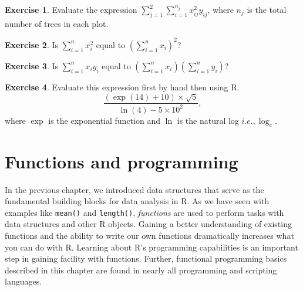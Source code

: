 \documentclass[
  11pt,
]{krantz}
\theoremstyle{definition}
\theoremstyle{definition}
\theoremstyle{definition}
\newtheorem{exercise}{Exercise}[chapter]
\theoremstyle{definition}
\theoremstyle{remark}
\begin{document}
\begin{exercise}
\protect\hypertarget{exr:pemdasEx7}{}\label{exr:pemdasEx7}Evaluate the expression \(\sum^2_{j=1}\sum^{n_j}_{i=1}x_{ij}^2y_{ij}\), where \(n_j\) is the total number of trees in each plot.
\end{exercise}

\begin{exercise}
\protect\hypertarget{exr:pemdasEx8}{}\label{exr:pemdasEx8}Is \(\sum^n_{i=1}x_i^2\) equal to \(\left(\sum^n_{i=1}x_i\right)^2\)?
\end{exercise}

\begin{exercise}
\protect\hypertarget{exr:pemdasEx9}{}\label{exr:pemdasEx9}Is \(\sum^n_{i=1}x_iy_i\) equal to \(\left(\sum^n_{i=1}x_i\right)\left(\sum^n_{i=1}y_i\right)\)?
\end{exercise}

\begin{exercise}
\protect\hypertarget{exr:pemdasEx10}{}\label{exr:pemdasEx10}Evaluate this expression first by hand then using R.
\[
\frac{\left(\exp(14) + 10\right) \times \sqrt{5}}{\ln(4) - 5 \times 10^2},
\]
where \(\exp\) is the exponential function and \(\ln\) is the natural log \(i.e., \log_e\).
\end{exercise}

\hypertarget{functions}{%
\chapter{Functions and programming}\label{functions}}

In the previous chapter, we introduced data structures that serve as the fundamental building blocks for data analysis in R. As we have seen with examples like \texttt{mean()} and \texttt{length()}, \emph{functions} are used to perform tasks with data structures and other R objects. Gaining a better understanding of existing functions and the ability to write our own functions dramatically increases what you can do with R. Learning about R's programming capabilities is an important step in gaining facility with functions. Further, functional programming basics described in this chapter are found in nearly all programming and scripting languages.
\end{document}
